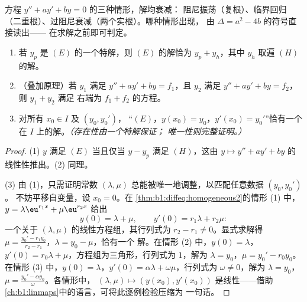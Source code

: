 \begin{omfigure}

{\small 方程 $y'' + ay' + by = 0$ 的三种情形，解均衰减：
阻尼振荡（复根）、临界回归
（二重根）、过阻尼衰减（两个实根）。哪种情形出现，
由 $\Delta = a^2 - 4b$ 的符号直接读出——
在求解之前即可判定。}
\end{omfigure}

\begin{theorem}[结构与柯西问题]\label{thm:b1:diffeq:structure2}
\begin{enumerate}
  \item 若 $y_p$ 是 $(E)$ 的一个特解，则
        $(E)$ 的解恰为 $y_p + y_h$，其中 $y_h$ 取遍
        $(H)$ 的解。
  \item （叠加原理）若 $y_1$ 满足 $y'' + ay' + by = f_1$，且
        $y_2$ 满足 $y'' + ay' + by = f_2$，则 $y_1 + y_2$ 满足
        右端为 $f_1 + f_2$ 的方程。
  \item 对所有 $x_0 \in I$ 及 $(y_0, y_0')$，
        “$(E)$，$y(x_0) = y_0$，$y'(x_0) = y_0'$”恰有一个
        在 $I$ 上的解。\emph{（存在性由一个特解保证；
        唯一性则完整证明。）}
\end{enumerate}
\end{theorem}

\begin{proof}
(1) $y$ 满足 $(E)$ 当且仅当 $y - y_p$ 满足 $(H)$，这由 $y
\mapsto y'' + ay' + by$ 的线性性推出。(2) 同理。

(3) 由 (1)，只需证明常数 $(\lambda,
\mu)$ 总能被唯一地调整，以匹配任意数据 $(y_0, y_0')$。
不妨平移自变量，设 $x_0 = 0$。在
\cref{thm:b1:diffeq:homogeneous2}的情形 (1) 中，$y = \lambda\eu^{r_1x} +
\mu\eu^{r_2x}$ 给出
\[
y(0) = \lambda + \mu, \qquad y'(0) = r_1\lambda + r_2\mu :
\]
一个关于 $(\lambda, \mu)$ 的线性方程组，其行列式为 $r_2 -
r_1 \neq 0$。显式求解得 $\mu = \frac{y_0' -
r_1y_0}{r_2 - r_1}$，$\lambda = y_0 - \mu$，恰有一个
解。在情形 (2) 中，$y(0) = \lambda$，$y'(0) = r_0\lambda +
\mu$，方程组为三角形，行列式为 $1$，解为
$\lambda = y_0$，$\mu = y_0' - r_0y_0$。在情形 (3) 中，$y(0) =
\lambda$，$y'(0) = \alpha\lambda + \omega\mu$，行列式为
$\omega \neq 0$，解为 $\lambda = y_0$，$\mu = \frac{y_0' -
\alpha y_0}\omega$。各情形中， $(\lambda, \mu) \mapsto
(y(x_0), y'(x_0))$ 是线性——借助
\cref{ch:b1:linmaps}中的语言，可将此逐例检验压缩为
一句话。
\end{proof}

